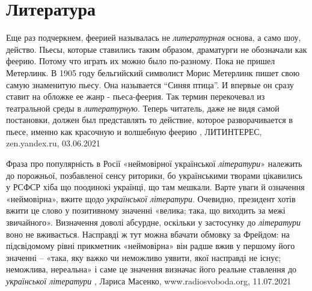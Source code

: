  
 
 
 
 
\chapter{Литература}
\label{sec:slova.literatura}

Еще раз подчеркнем, феерией называлась не \emph{литературная} основа, а само шоу,
действо. Пьесы, которые ставились таким образом, драматурги не обозначали как
феерию. Потому что играть их можно было по-разному.  Пока не пришел Метерлинк.
В 1905 году бельгийский символист Морис Метерлинк пишет свою самую знаменитую
пьесу. Она называется \enquote{Синяя птица}. И впервые он сразу ставит на обложке ее
жанр - пьеса-феерия.  Так термин перекочевал из театральной среды в
\emph{литературную}. Теперь читатель, даже не видя самой постановки, должен был
представлять то действие, которое разворачивается в пьесе, именно как красочную
и волшебную феерию
, 
ЛИТИНТЕРЕС, zen.yandex.ru, 03.06.2021

Фраза про популярність в Росії «неймовірної української \emph{літератури}» належить до
порожньої, позбавленої сенсу риторики, бо українськими творами цікавились у
РСФСР хіба що поодинокі українці, що там мешкали.
Варте уваги й означення «неймовірна», вжите щодо \emph{української літератури}.
Очевидно, президент хотів вжити це слово у позитивному значенні «велика; така,
що виходить за межі звичайного». Визначення доволі абсурдне, оскільки у
застосунку до \emph{літератури} воно не вживається. Насправді ж тут можна вбачати
обмовку за Фрейдом: на підсвідомому рівні прикметник «неймовірна» він радше
вжив у першому його значенні – «така, яку важко чи неможливо уявити, якої
насправді не існує; неможлива, нереальна» і саме це значення визначає його
реальне ставлення до \emph{української літератури}
, 
Лариса Масенко, www.radiosvoboda.org, 11.07.2021


